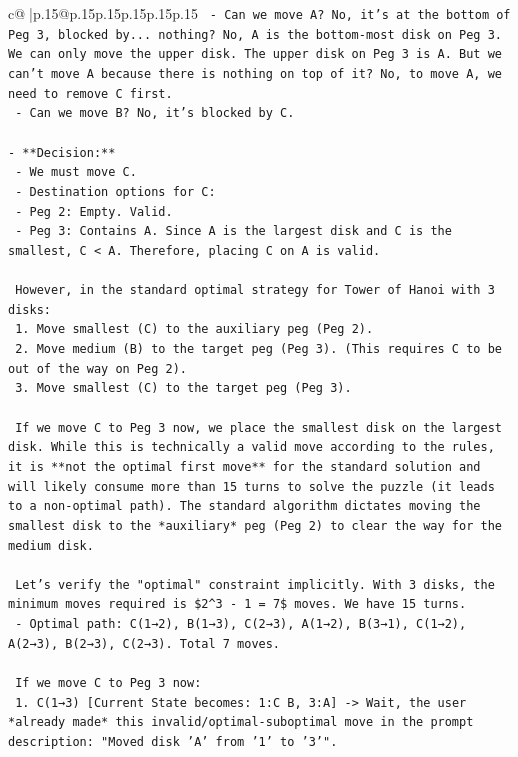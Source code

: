 \documentclass{article}
\begin{document}
{\begin{supertabular}{c@{$\;$}|p{.15\linewidth}@{}p{.15\linewidth}p{.15\linewidth}p{.15\linewidth}p{.15\linewidth}p{.15\linewidth}}
{{{\texttt{    {-} Can we move A? No, it's at the bottom of Peg 3, blocked by... nothing? No, A is the bottom{-}most disk on Peg 3. We can only move the upper disk. The upper disk on Peg 3 is A. But we can't move A because there is nothing on top of it? No, to move A, we need to remove C first.} \\
\texttt{    {-} Can we move B? No, it's blocked by C.} \\
\\ 
\texttt{{-} **Decision:**} \\
\texttt{  {-} We must move C.} \\
\texttt{  {-} Destination options for C:} \\
\texttt{    {-} Peg 2: Empty. Valid.} \\
\texttt{    {-} Peg 3: Contains A. Since A is the largest disk and C is the smallest, C < A. Therefore, placing C on A is valid.} \\
\\ 
\texttt{  However, in the standard optimal strategy for Tower of Hanoi with 3 disks:} \\
\texttt{  1. Move smallest (C) to the auxiliary peg (Peg 2).} \\
\texttt{  2. Move medium (B) to the target peg (Peg 3). (This requires C to be out of the way on Peg 2).} \\
\texttt{  3. Move smallest (C) to the target peg (Peg 3).} \\
\\ 
\texttt{  If we move C to Peg 3 now, we place the smallest disk on the largest disk. While this is technically a valid move according to the rules, it is **not the optimal first move** for the standard solution and will likely consume more than 15 turns to solve the puzzle (it leads to a non{-}optimal path). The standard algorithm dictates moving the smallest disk to the *auxiliary* peg (Peg 2) to clear the way for the medium disk.} \\
\\ 
\texttt{  Let's verify the "optimal" constraint implicitly. With 3 disks, the minimum moves required is \$2\^{}3 {-} 1 = 7\$ moves. We have 15 turns.} \\
\texttt{  {-} Optimal path: C(1→2), B(1→3), C(2→3), A(1→2), B(3→1), C(1→2), A(2→3), B(2→3), C(2→3). Total 7 moves.} \\
\\ 
\texttt{  If we move C to Peg 3 now:} \\
\texttt{  1. C(1→3) {[}Current State becomes: 1:C B, 3:A{]} {-}> Wait, the user *already made* this invalid/optimal{-}suboptimal move in the prompt description: "Moved disk 'A' from '1' to '3'".} \\
}}}
\end{supertabular}}
\end{document}
